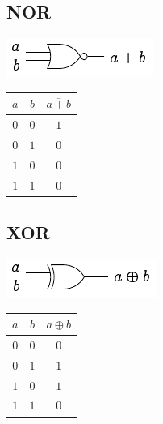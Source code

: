 \begin{multicols}{4}
	\subsection*{NOR}
	\begin{minipage}[t][2em][c]{\linewidth}
		\centering
		\includegraphics{fig.nor.pdf}
	\end{minipage}
	\begin{center}
		\begin{tabular}{cc|c}
			\toprule
			$a$ & $b$ & $\overline{a+b}$ \\
			\midrule
			$0$ & $0$ & $1$              \\
			$0$ & $1$ & $0$              \\
			$1$ & $0$ & $0$              \\
			$1$ & $1$ & $0$              \\
			\bottomrule
		\end{tabular}
	\end{center}

	\columnbreak

	\subsection*{XOR}
	\begin{minipage}[t][2em][c]{\linewidth}
		\centering
		\includegraphics{fig.xor.pdf}
	\end{minipage}
	\begin{center}
		\begin{tabular}{cc|c}
			\toprule
			$a$ & $b$ & $a \oplus b$ \\
			\midrule
			$0$ & $0$ & $0$          \\
			$0$ & $1$ & $1$          \\
			$1$ & $0$ & $1$          \\
			$1$ & $1$ & $0$          \\
			\bottomrule
		\end{tabular}
	\end{center}


\end{multicols}
